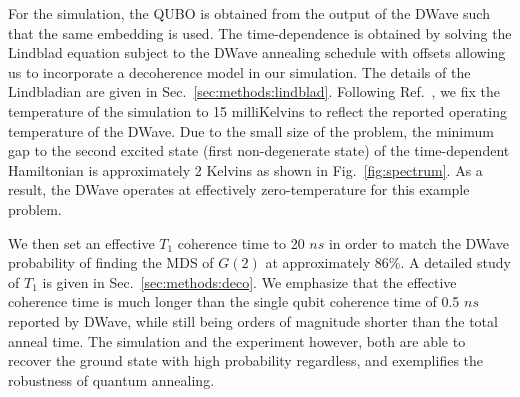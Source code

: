 \documentclass[prd,twocolumn,tightenlines,preprintnumbers,showpacs,superscriptaddress,notitlepage,nofootinbib,eqsecnum,floatfix,longbibliography]{revtex4}
\begin{document}
For the simulation, the QUBO is obtained from the output of the DWave such that the same embedding is used. The time-dependence is obtained by solving the Lindblad equation subject to the DWave annealing schedule with offsets allowing us to incorporate a decoherence model in our simulation. The details of the Lindbladian are given in Sec.~\ref{sec:methods:lindblad}. Following Ref.~\cite{}, we fix the temperature of the simulation to 15 milliKelvins to reflect the reported operating temperature of the DWave. Due to the small size of the problem, the minimum gap to the second excited state (first non-degenerate state) of the time-dependent Hamiltonian is approximately 2 Kelvins as shown in Fig.~\ref{fig:spectrum}. As a result, the DWave operates at effectively zero-temperature for this example problem.

We then set an effective $T_1$ coherence time to 20 $ns$ in order to match the DWave probability of finding the MDS of $G(2)$ at approximately 86\%. A detailed study of $T_1$ is given in Sec.~\ref{sec:methods:deco}. We emphasize that the effective coherence time is much longer than the single qubit coherence time of 0.5 $ns$ reported by DWave, while still being orders of magnitude shorter than the total anneal time. The simulation and the experiment however, both are able to recover the ground state with high probability regardless, and exemplifies the robustness of quantum annealing.
\end{document}

